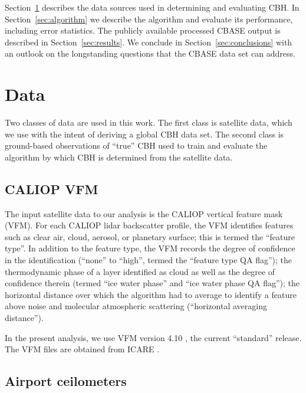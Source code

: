 \documentclass[essd,manuscript]{copernicus}\usepackage[]{graphicx}\usepackage[]{color}
\newcommand{\hlnum}[1]{\textcolor[rgb]{0.686,0.059,0.569}{#1}}%
\newcommand\comment[2]{\{\hlnum{ \textit{#1}: #2}\}}
\newcommand\commentjm[1]{\comment{$j_\mu$}{#1}}
\begin{document}
Section~\ref{sec:data} describes the data sources used in determining and
evaluating CBH.  In Section~\ref{sec:algorithm} we describe
the algorithm and evaluate its performance, including error statistics.  The
publicly available processed CBASE output is described in
Section~\ref{sec:results}.  We conclude in Section~\ref{sec:conclusions} with an
outlook on the longstanding questions that the CBASE data set can address.

\section{Data}
\label{sec:data}

Two classes of data are used in this work.  The first class is satellite data,
which we use with the intent of deriving a global CBH data set.
The second class is ground-based observations of ``true'' CBH used
to train and evaluate the algorithm by which CBH is determined from
the satellite data.

\subsection{CALIOP VFM}

The input satellite data to our analysis is the CALIOP vertical feature mask
(VFM).  For each CALIOP lidar backscatter profile, the VFM identifies features
such as clear air, cloud, aerosol, or planetary surface; this is termed the
``feature type''.  In addition to the feature type, the VFM records the degree
of confidence in the identification (``none'' to ``high'', termed the ``feature
type QA flag''); the thermodynamic phase of a layer identified as cloud as well
as the degree of confidence therein (termed ``ice water phase'' and ``ice water
phase QA flag''); the horizontal distance over which the algorithm had to
average to identify a feature above noise and molecular atmospheric scattering
(``horizontal averaging distance'').

In the present analysis, we use VFM version 4.10 \citep{vfm}, the current
``standard'' release.  The VFM files are obtained from ICARE \citep{icare}.

\subsection{Airport ceilometers}
\end{document}

